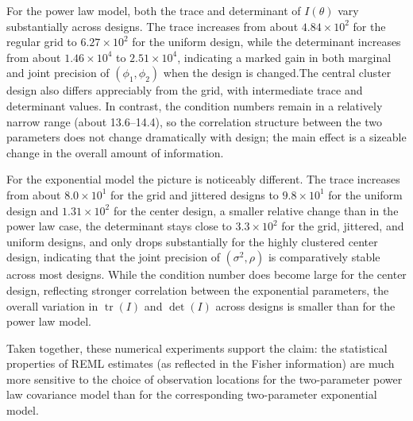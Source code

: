 \documentclass[answers,12pt,addpoints]{exam}
\begin{document}
\begin{questions}
\begin{solution}
    

For the power law model, both the trace and determinant of $I(\theta)$
vary substantially across designs.  The trace increases from about
$4.84\times10^{2}$ for the regular grid to $6.27\times10^{2}$ for the
uniform design, while the determinant increases from about
$1.46\times10^{4}$ to $2.51\times10^{4}$, indicating a marked gain in
both marginal and joint precision of $(\phi_1,\phi_2)$ when the design
is changed.The central cluster design also differs
appreciably from the grid, with intermediate trace and determinant
values.  In contrast, the condition numbers remain in a relatively
narrow range (about 13.6--14.4), so the correlation structure between
the two parameters does not change dramatically with design; the main
effect is a sizeable change in the overall amount of information.

For the exponential model the picture is noticeably different.  The
trace increases from about $8.0\times10^{1}$ for the grid and jittered
designs to $9.8\times10^{1}$ for the uniform design and
$1.31\times10^{2}$ for the center design, a smaller relative change
than in the power law case, the determinant
stays close to $3.3\times10^{2}$ for the grid, jittered, and uniform
designs, and only drops substantially for the highly clustered center
design, indicating that the joint precision of $(\sigma^2,\rho)$ is
comparatively stable across most designs. While the
condition number does become large for the center design, reflecting
stronger correlation between the exponential parameters, the overall
variation in $\operatorname{tr}(I)$ and $\det(I)$ across designs is
smaller than for the power law model.

Taken together, these numerical experiments support the claim: the statistical properties of REML estimates (as reflected in
the Fisher information) are much more sensitive to the choice of
observation locations for the two-parameter power law covariance model
than for the corresponding two-parameter exponential model.
\end{solution}

\end{questions}
\end{document}
